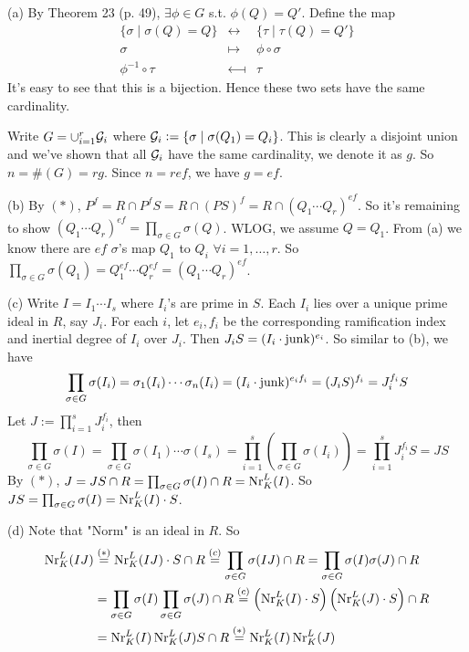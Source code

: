 \documentclass[../Marcus.tex]{subfiles}
\begin{document}
(a) By Theorem 23 (p. 49), $\exists\phi\in G$ s.t. $\phi(Q)=Q'$. Define the map
$$
\begin{array}{ccc}
    \{\sigma\mid \sigma(Q)=Q\} & \longleftrightarrow & \{\tau\mid \tau(Q)=Q'\} \\
    \sigma & \longmapsto & \phi\circ\sigma \\
    \phi^{-1}\circ\tau & \longmapsfrom & \tau
    \end{array}
$$
It's easy to see that this is a bijection. Hence these two sets have the same cardinality.

Write $G=\cup_{i=1}^r \mathcal{G}_i$ where $\mathcal{G}_i:=\{\sigma\mid \sigma(Q_1)=Q_i\}$. This is clearly a disjoint union and we've shown that all $\mathcal{G}_i$ have the same cardinality, we denote it as $g$. So $n=\#(G)=rg$. Since $n=ref$, we have $g=ef$.

(b) By $(*)$, $P^f=R\cap P^fS=R\cap(PS)^f=R\cap(Q_1\cdots Q_r)^{ef}$. So it's remaining to show $(Q_1\cdots Q_r)^{ef}=\prod_{\sigma\in G}\sigma(Q)$. WLOG, we assume $Q=Q_1$. From (a) we know there are $ef$ $\sigma$'s map $Q_1$ to $Q_i$ $\forall i=1,\ldots,r$. So $\prod_{\sigma\in G}\sigma(Q_1)=Q_1^{ef}\cdots Q_r^{ef}=(Q_1\cdots Q_r)^{ef}$.

(c) Write $I=I_1\cdots I_s$ where $I_i$'s are prime in $S$. Each $I_i$ lies over a unique prime ideal in $R$, say $J_i$. For each $i$, let $e_i,f_i$ be the corresponding ramification index and inertial degree of $I_i$ over $J_i$. Then $J_iS=(I_i\cdot\operatorname{junk})^{e_i}$. So similar to (b), we have $$\prod_{\sigma\in G}\sigma(I_i)=\sigma_1(I_i)\cdots\sigma_n(I_i)=(I_i\cdot\operatorname{junk})^{e_if_i}=(J_iS)^{f_i}=J_i^{f_i}S$$ Let $J:=\prod_{i=1}^s J_i^{f_i}$, then $$\prod_{\sigma\in G}\sigma(I)=\prod_{\sigma\in G}\sigma(I_1)\cdots\sigma(I_s)=\prod_{i=1}^s\left(\prod_{\sigma\in G}\sigma(I_i)\right)=\prod_{i=1}^s J_i^{f_i}S=JS$$ By $(*)$, $J=JS\cap R=\prod_{\sigma\in G}\sigma(I)\cap R=\operatorname{Nr}^L_K(I)$. So $JS=\prod_{\sigma\in G}\sigma(I)=\operatorname{Nr}^L_K(I)\cdot S$.

(d) Note that "Norm" is an ideal in $R$. So
\begin{align*}
    \operatorname{Nr}^L_K(IJ) &\overset{(*)}{=} \operatorname{Nr}^L_K(IJ)\cdot S\cap R \overset{(c)}{=} \prod_{\sigma\in G}\sigma(IJ)\cap R = \prod_{\sigma\in G}\sigma(I)\sigma(J)\cap R \\
    &= \prod_{\sigma\in G}\sigma(I)\prod_{\sigma\in G}\sigma(J)\cap R \overset{(c)}{=} \left(\operatorname{Nr}^L_K(I)\cdot S\right)\left(\operatorname{Nr}^L_K(J)\cdot S\right)\cap R \\
    &= \operatorname{Nr}^L_K(I)\operatorname{Nr}^L_K(J)S\cap R \overset{(*)}{=} \operatorname{Nr}^L_K(I)\operatorname{Nr}^L_K(J)
\end{align*}
\end{document}
